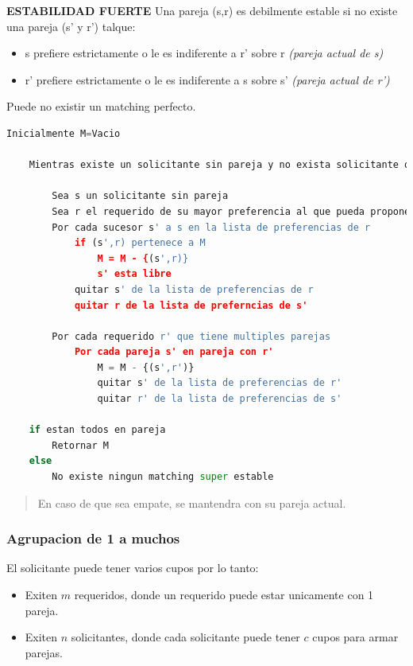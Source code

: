 \documentclass{article}
\begin{document}
\noindent
\textbf{ESTABILIDAD FUERTE}
\newline Una pareja (s,r) es debilmente estable si no existe una pareja (s' y r') talque:
\begin{itemize}
    \item s prefiere estrictamente o le es indiferente a r' sobre r \textit{(pareja actual de s)}
    \item r' prefiere estrictamente o le es indiferente a s sobre s' \textit{(pareja actual de r')}
\end{itemize}
Puede no existir un matching perfecto.

\begin{lstlisting}[language=Python, caption=Algoritmo para parejas super estables]
    Inicialmente M=Vacio
    
    Mientras existe un solicitante sin pareja y no exista solicitante que agoto sus parejas
    
        Sea s un solicitante sin pareja
        Sea r el requerido de su mayor preferencia al que pueda proponer
        Por cada sucesor s' a s en la lista de preferencias de r
            if (s',r) pertenece a M
                M = M - {(s',r)}
                s' esta libre
            quitar s' de la lista de preferencias de r
            quitar r de la lista de preferncias de s'

        Por cada requerido r' que tiene multiples parejas
            Por cada pareja s' en pareja con r' 
                M = M - {(s',r')}
                quitar s' de la lista de preferencias de r'
                quitar r' de la lista de preferencias de s'

    if estan todos en pareja
        Retornar M
    else
        No existe ningun matching super estable
\end{lstlisting}    
\begin{quote}
    En caso de que sea empate, se mantendra con su pareja actual.
\end{quote}

\newpage
\subsubsection{Agrupacion de 1 a muchos}
El solicitante puede tener varios cupos por lo tanto:
\begin{itemize}
    \item Exiten \(m\) requeridos, donde un requerido puede estar unicamente con 1 pareja.
    \item Exiten \(n\) solicitantes, donde cada solicitante puede tener \(c\) cupos para armar parejas.
\end{itemize}
\end{document}
